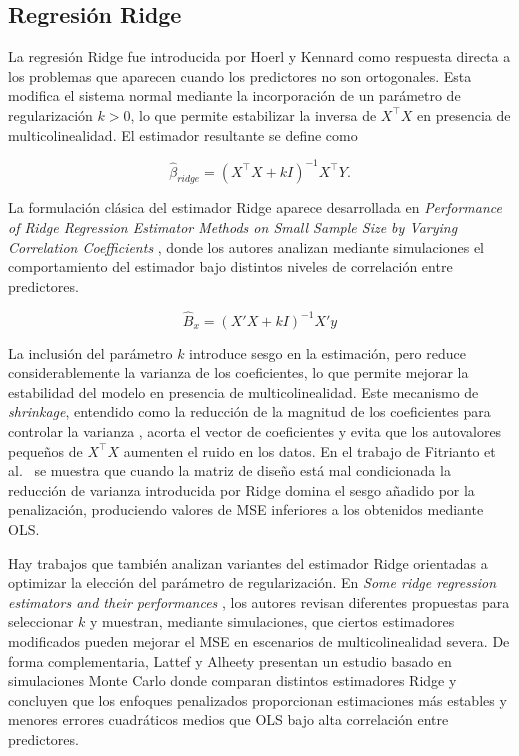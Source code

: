\documentclass[12pt,a4paper]{report}
\begin{document}
\subsection{Regresión Ridge}

La regresión Ridge fue introducida por Hoerl y Kennard \cite{hoerl1970} como respuesta directa a los problemas que aparecen cuando los predictores no son ortogonales. Esta modifica el sistema normal mediante la incorporación de un parámetro de regularización \(k>0\), lo que permite estabilizar la inversa de \(X^\top X\) en presencia de multicolinealidad. El estimador resultante se define como

\[
\hat{\beta}_{ridge} = (X^{\top}X + kI)^{-1} X^{\top}Y.
\]

La formulación clásica del estimador Ridge aparece desarrollada en \textit{Performance of Ridge Regression Estimator Methods on Small Sample Size by Varying Correlation Coefficients} \cite{fitrianto2014}, donde los autores analizan mediante simulaciones el comportamiento del estimador bajo distintos niveles de correlación entre predictores.

\[
\hat{B}_x = (X'X + kI)^{-1} X'y 
\]

La inclusión del parámetro \(k\) introduce sesgo en la estimación, pero reduce considerablemente la varianza de los coeficientes, lo que permite mejorar la estabilidad del modelo en presencia de multicolinealidad. Este mecanismo de \textit{shrinkage}, entendido como la reducción de la magnitud de los coeficientes para controlar la varianza \cite{hastie2009}, acorta el vector de coeficientes y evita que los autovalores pequeños de \(X^\top X\) aumenten el ruido en los datos. En el trabajo de Fitrianto et al.\ \cite{fitrianto2014} se muestra que cuando la matriz de diseño está mal condicionada la reducción de varianza introducida por Ridge domina el sesgo añadido por la penalización, produciendo valores de MSE inferiores a los obtenidos mediante OLS.

Hay trabajos que también analizan variantes del estimador Ridge orientadas a optimizar la elección del parámetro de regularización. En \textit{Some ridge regression estimators and their performances} \cite{kibria2016}, los autores revisan diferentes propuestas para seleccionar \(k\) y muestran, mediante simulaciones, que ciertos estimadores modificados pueden mejorar el MSE en escenarios de multicolinealidad severa. De forma complementaria, Lattef y Alheety \cite{lattef2020} presentan un estudio basado en simulaciones Monte Carlo donde comparan distintos estimadores Ridge y concluyen que los enfoques penalizados proporcionan estimaciones más estables y menores errores cuadráticos medios que OLS bajo alta correlación entre predictores.
\end{document}

